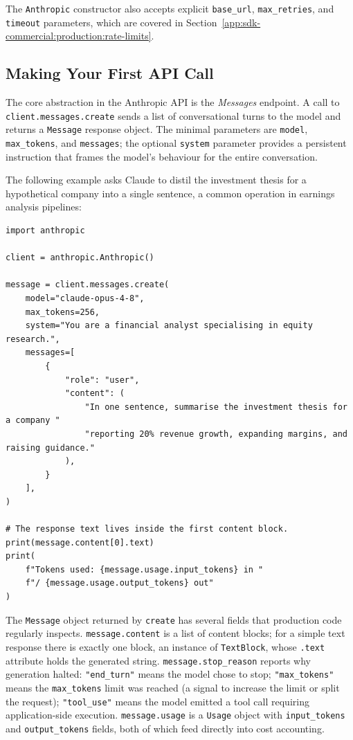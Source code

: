 The \texttt{Anthropic} constructor also accepts explicit \texttt{base\_url},
\texttt{max\_retries}, and \texttt{timeout} parameters, which are covered in
Section~\ref{app:sdk-commercial:production:rate-limits}.

\subsection{Making Your First API Call}
\label{app:sdk-commercial:sdk:first-call}

The core abstraction in the Anthropic API is the \emph{Messages} endpoint. A call to
\texttt{client.messages.create} sends a list of conversational turns to the model and
returns a \texttt{Message} response object. The minimal parameters are \texttt{model},
\texttt{max\_tokens}, and \texttt{messages}; the optional \texttt{system} parameter
provides a persistent instruction that frames the model's behaviour for the entire
conversation.

The following example asks Claude to distil the investment thesis for a hypothetical
company into a single sentence, a common operation in earnings analysis pipelines:

\begin{verbatim}
import anthropic

client = anthropic.Anthropic()

message = client.messages.create(
    model="claude-opus-4-8",
    max_tokens=256,
    system="You are a financial analyst specialising in equity research.",
    messages=[
        {
            "role": "user",
            "content": (
                "In one sentence, summarise the investment thesis for a company "
                "reporting 20% revenue growth, expanding margins, and raising guidance."
            ),
        }
    ],
)

# The response text lives inside the first content block.
print(message.content[0].text)
print(
    f"Tokens used: {message.usage.input_tokens} in "
    f"/ {message.usage.output_tokens} out"
)
\end{verbatim}

The \texttt{Message} object returned by \texttt{create} has several fields that
production code regularly inspects. \texttt{message.content} is a list of content
blocks; for a simple text response there is exactly one block, an instance of
\texttt{TextBlock}, whose \texttt{.text} attribute holds the generated string.
\texttt{message.stop\_reason} reports why generation halted: \texttt{"end\_turn"}
means the model chose to stop; \texttt{"max\_tokens"} means the \texttt{max\_tokens}
limit was reached (a signal to increase the limit or split the request);
\texttt{"tool\_use"} means the model emitted a tool call requiring application-side
execution. \texttt{message.usage} is a \texttt{Usage} object with
\texttt{input\_tokens} and \texttt{output\_tokens} fields, both of which feed
directly into cost accounting.

